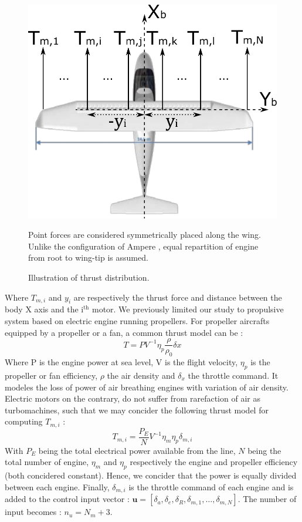 \begin{figure}[hbt!]
	\centering
	\includegraphics[width=.6\textwidth]{AmpereTop}
	\caption{Illustration of thrust distribution.} Point forces are considered symmetrically placed along the wing. Unlike the configuration of Ampere \cite{Ampere_concept}, equal repartition of engine from root to wing-tip is assumed. \label{fig:AmpereTop}
\end{figure}

Where $T_{m,i}$ and $y_i$ are respectively the thrust force and distance between the body X axis and the i$^{\text{th}}$ motor. 
We previously limited our study to propulsive system based on electric engine running propellers. For propeller aircrafts equipped by a propeller or a fan, a common thrust model can be \cite{SachsElectricPerf}:
\begin{equation}
	T=PV^{-1} \eta_p \frac{\rho}{\rho_0} \delta x
\end{equation}
Where P is the engine power at sea level, V is the flight velocity, $\eta_p$ is the propeller or fan efficiency, $\rho$ the air density and $\delta_x$ the throttle command. It modeles the loss of power of air breathing engines with variation of air density. Electric motors on the contrary, do not suffer from rarefaction of air as turbomachines, such that we may concider the following thrust model for computing $T_{m,i}$ \cite{SachsElectricPerf}:
\begin{equation}
	T_{m,i}=\frac{P_E}{N}V^{-1}\eta_m\eta_p \delta_{m,i}
\end{equation}
With $P_E$ being the total electrical power available from the line, $N$ being the total number of engine, $\eta_m$ and $\eta_p$ respectively the engine and propeller efficiency (both concidered constant). Hence, we concider that the power is equally divided between each engine. Finally, $\delta_{m,i}$ is the throttle command of each engine and is added to the control input vector : $\textbf{u}=[\delta_a , \delta_e , \delta_R , \delta_{m,1} , \dots , \delta_{m,N}]$. The number of input becomes : $n_u=N_m+3$.

